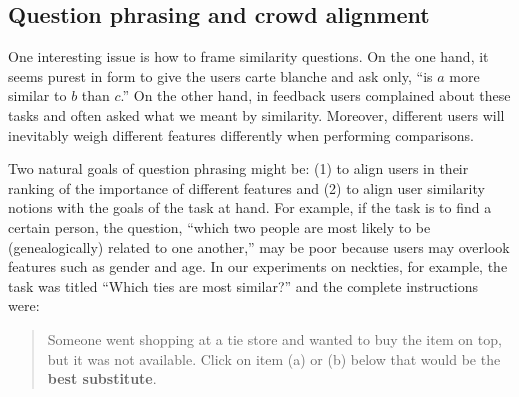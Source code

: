 \documentclass{article}
\begin{document}
\subsection{Question phrasing and crowd alignment}
One interesting issue is how to frame similarity questions.  On the
one hand, it seems purest in form to give the users carte blanche and
ask only, ``is $a$ more similar to $b$ than $c$.''  On the other hand,
in feedback users complained about these tasks and often asked what we
meant by similarity.  Moreover, different users will inevitably weigh
different features differently when performing comparisons. 



Two natural goals of question phrasing might be: (1) to align users in
their ranking of the importance of different features and (2) to align
user similarity notions with the goals of the task at hand.  For
example, if the task is to find a certain person, the question,
``which two people are most likely to be (genealogically) related to
one another,'' may be poor because users may overlook features such as
gender and age.  In our experiments on neckties, for example, the task
was titled ``Which ties are most similar?'' and the complete
instructions were:

\begin{quote}
  Someone went shopping at a tie store and wanted to buy the item on
  top, but it was not available. Click on item (a) or (b) below that
  would be the {\bf best substitute}.
\end{quote}
\end{document}
